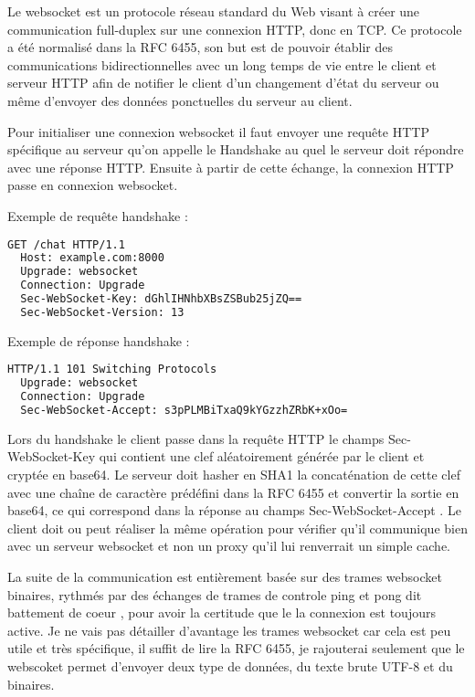 Le websocket est un protocole réseau standard du Web visant à créer une communication full-duplex sur une connexion HTTP, donc en TCP. Ce protocole a été normalisé dans la RFC 6455, son but est de pouvoir établir des communications bidirectionnelles avec un long temps de vie entre le client et serveur HTTP afin de notifier le client d'un changement d'état du serveur ou même d'envoyer des données ponctuelles du serveur au client.

Pour initialiser une connexion websocket il faut envoyer une requête HTTP spécifique au serveur qu'on appelle le \og Handshake \fg{} au quel le serveur doit répondre avec une réponse HTTP. Ensuite à partir de cette échange, la connexion HTTP passe en connexion websocket.

\noindent Exemple de requête handshake :
\begin{lstlisting}[language=bash]
  GET /chat HTTP/1.1
  Host: example.com:8000
  Upgrade: websocket
  Connection: Upgrade
  Sec-WebSocket-Key: dGhlIHNhbXBsZSBub25jZQ==
  Sec-WebSocket-Version: 13
\end{lstlisting}

\noindent Exemple de réponse handshake :
\begin{lstlisting}[language=bash]
  HTTP/1.1 101 Switching Protocols
  Upgrade: websocket
  Connection: Upgrade
  Sec-WebSocket-Accept: s3pPLMBiTxaQ9kYGzzhZRbK+xOo=
\end{lstlisting}

Lors du handshake le client passe dans la requête HTTP le champs \og Sec-WebSocket-Key \fg{} qui contient une clef aléatoirement générée par le client et cryptée en base64. Le serveur doit hasher en SHA1 la concaténation de cette clef avec une chaîne de caractère prédéfini dans la RFC 6455 et convertir la sortie en base64, ce qui correspond dans la réponse au champs \og Sec-WebSocket-Accept \fg{}. Le client doit ou peut réaliser la même opération pour vérifier qu'il communique bien avec un serveur websocket et non un proxy qu'il lui renverrait un simple cache.

La suite de la communication est entièrement basée sur des trames websocket binaires, rythmés par des échanges de trames de controle ping et pong dit \og battement de coeur \fg{}, pour avoir la certitude que le la connexion est toujours active. Je ne vais pas détailler d'avantage les trames websocket car cela est peu utile et très spécifique, il suffit de lire la RFC 6455, je rajouterai seulement que le webscoket permet d'envoyer deux type de données, du texte brute UTF-8 et du binaires.

